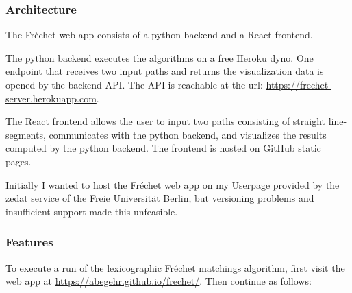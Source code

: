 \subsubsection{Architecture}

The Frèchet web app consists of a python backend and a React frontend.\

The python backend executes the algorithms on a free Heroku dyno. One endpoint that receives two input paths and returns the visualization data is opened by the backend API. The API is reachable at the url: \url{https://frechet-server.herokuapp.com}.\

The React frontend allows the user to input two paths consisting of straight line-segments, communicates with the python backend, and visualizes the results computed by the python backend. The frontend is hosted on GitHub static pages.\

Initially I wanted to host the Fréchet web app on my Userpage provided by the zedat service of the Freie Universität Berlin, but versioning problems and insufficient support made this unfeasible.

\subsubsection{Features}

To execute a run of the lexicographic Fréchet matchings algorithm, first visit the web app at \url{https://abegehr.github.io/frechet/}. Then continue as follows:

